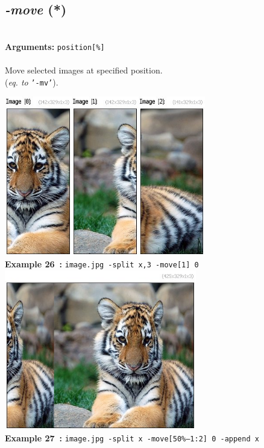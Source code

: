 \documentclass[a4paper,11pt,twoside]{book}
\begin{document}
\subsection{\emph{-move} (*)}\vspace*{-0.5em}
~\\\textbf{Arguments: } 
{\small \texttt{position[\%]}}\\~\\
Move selected images at specified position.
~\\(\emph{eq. to} {\small \texttt{'-mv'}}).
\begin{center}\includegraphics[keepaspectratio=true,height=7cm,width=\textwidth]{img/gmic_def26.jpg}\\
{\footnotesize \textbf{Example 26~:} \texttt{image.jpg -split x,3 -move[1] 0}}
\\\includegraphics[keepaspectratio=true,height=7cm,width=\textwidth]{img/gmic_def27.jpg}\\
{\footnotesize \textbf{Example 27~:} \texttt{image.jpg -split x -move[50\%--1:2] 0 -append x}}
\end{center}
\end{document}
